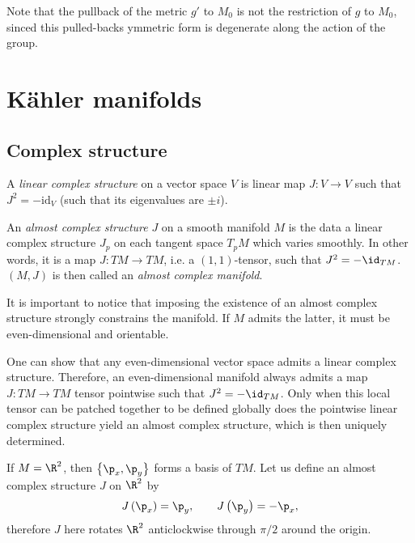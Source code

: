 \documentclass{worksheetclass}
\begin{document}
    Note that the pullback of the metric $g'$ to $M_0$ is not the restriction of $g$ to $M_0$, sinced this pulled-backs ymmetric form is degenerate along the action of the group.

\section{Kähler manifolds}

    \subsection{Complex structure}

        \begin{defn}
            A \emph{linear complex structure} on a vector space $V$ is linear map $J:V\to V$ such that $J^2=-\text{id}_V$ (such that its eigenvalues are $\pm i$).
        \end{defn}
        
        \begin{defn}
            An \emph{almost complex structure} $J$ on a smooth manifold $M$ is the data a linear complex structure $J_p$ on each tangent space $T_pM$ which varies smoothly. In other words, it is a map $J:TM\to TM$, i.e. a $(1,1)$-tensor, such that $J^2=-\id_{TM}$. $(M,J)$ is then called an \emph{almost complex manifold}.
        \end{defn}
        
        It is important to notice that imposing the existence of an almost complex structure strongly constrains the manifold. If $M$ admits the latter, it must be even-dimensional and orientable.

        One can show that any even-dimensional vector space admits a linear complex structure. Therefore, an even-dimensional manifold always admits a map $J:TM\to TM$ tensor pointwise such that $J^2=-\id_{TM}$. Only when this local tensor can be patched together to be defined globally does the pointwise linear complex structure yield an almost complex structure, which is then uniquely determined.

        \begin{examp}
            If $M=\R^2$, then $\left\{\p_x,\p_y\right\}$ forms a basis of $TM$. Let us define an almost complex structure $J$ on $\R^2$ by
            \begin{equation}
                J\left( \p_x \right)=\p_{y},\qquad J\left( \p_{y} \right)=-\p_{x},
            \end{equation}
            therefore $J$ here rotates $\R^2$ anticlockwise through $\pi/2$ around the origin.
        \end{examp}
\end{document}
